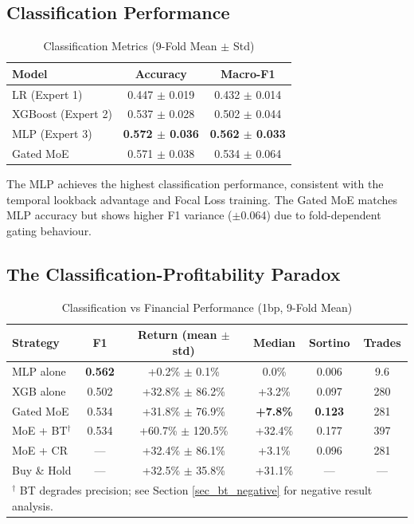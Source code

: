 \documentclass[conference]{IEEEtran}
\begin{document}
\subsection{Classification Performance}
\begin{table}[htbp]
\caption{Classification Metrics (9-Fold Mean $\pm$ Std)}
\begin{center}
\begin{tabular}{lcc}
\toprule
\textbf{Model} & \textbf{Accuracy} & \textbf{Macro-F1} \\
\midrule
LR (Expert 1)          & 0.447 $\pm$ 0.019 & 0.432 $\pm$ 0.014 \\
XGBoost (Expert 2)     & 0.537 $\pm$ 0.028 & 0.502 $\pm$ 0.044 \\
MLP (Expert 3)         & \textbf{0.572 $\pm$ 0.036} & \textbf{0.562 $\pm$ 0.033} \\
Gated MoE              & 0.571 $\pm$ 0.038 & 0.534 $\pm$ 0.064 \\
\bottomrule
\end{tabular}
\end{center}
\end{table}

The MLP achieves the highest classification performance, consistent with
the temporal lookback advantage and Focal Loss training. The Gated MoE
matches MLP accuracy but shows higher F1 variance ($\pm$0.064) due to
fold-dependent gating behaviour.

\subsection{The Classification-Profitability Paradox}
\begin{table}[htbp]
\caption{Classification vs Financial Performance (1bp, 9-Fold Mean)}
\label{tab_paradox}
\begin{center}
\begin{tabular}{lccccc}
\toprule
\textbf{Strategy} & \textbf{F1} & \textbf{Return (mean $\pm$ std)} & \textbf{Median} & \textbf{Sortino} & \textbf{Trades} \\
\midrule
MLP alone     & \textbf{0.562} & +0.2\% $\pm$ 0.1\%    & 0.0\%    & 0.006 & 9.6 \\
XGB alone     & 0.502          & +32.8\% $\pm$ 86.2\%   & +3.2\%   & 0.097 & 280 \\
Gated MoE     & 0.534          & +31.8\% $\pm$ 76.9\%   & \textbf{+7.8\%}   & \textbf{0.123} & 281 \\
MoE + BT$^\dagger$  & 0.534    & +60.7\% $\pm$ 120.5\%  & +32.4\%  & 0.177 & 397 \\
MoE + CR      & ---            & +32.4\% $\pm$ 86.1\%   & +3.1\%   & 0.096 & 281 \\
Buy \& Hold   & ---            & +32.5\% $\pm$ 35.8\%   & +31.1\%  & ---   & --- \\
\bottomrule
\multicolumn{6}{l}{\footnotesize $^\dagger$ BT degrades precision; see Section \ref{sec_bt_negative} for negative result analysis.}
\end{tabular}
\end{center}
\end{table}
\end{document}
